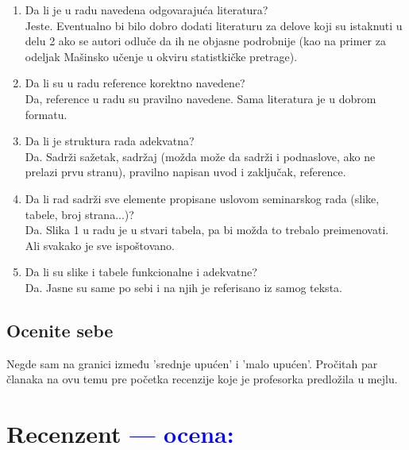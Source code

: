 \documentclass[a4paper]{report}
\newcommand{\odgovor}[1]{\textcolor{blue}{#1}}
\begin{document}
\begin{enumerate}
\item Da li je u radu navedena odgovarajuća literatura?\\ 
Jeste. Eventualno bi bilo dobro dodati literaturu za delove koji su istaknuti u delu 2 ako se autori odluče da ih ne objasne podrobnije (kao na primer za odeljak Mašinsko učenje u okviru statistkičke pretrage). 

\item Da li su u radu reference korektno navedene?\\ 
Da, reference u radu su pravilno navedene. Sama literatura je u dobrom formatu.

\item Da li je struktura rada adekvatna?\\ 
Da. Sadrži sažetak, sadržaj (možda može da sadrži i podnaslove, ako ne prelazi prvu stranu), pravilno napisan uvod i zaključak, reference.

\item Da li rad sadrži sve elemente propisane uslovom seminarskog rada (slike, tabele, broj strana...)?\\ 
Da. Slika 1 u radu je u stvari tabela, pa bi možda to trebalo preimenovati. Ali svakako je sve ispoštovano. 

\item Da li su slike i tabele funkcionalne i adekvatne?\\ 
Da. Jasne su same po sebi i na njih je referisano iz samog teksta.
\end{enumerate}

\section{Ocenite sebe}
Negde sam na granici između 'srednje upućen' i 'malo upućen'. Pročitah par članaka na ovu temu pre početka recenzije koje je profesorka predložila u mejlu.


\chapter{Recenzent \odgovor{--- ocena:} }
\end{document}
